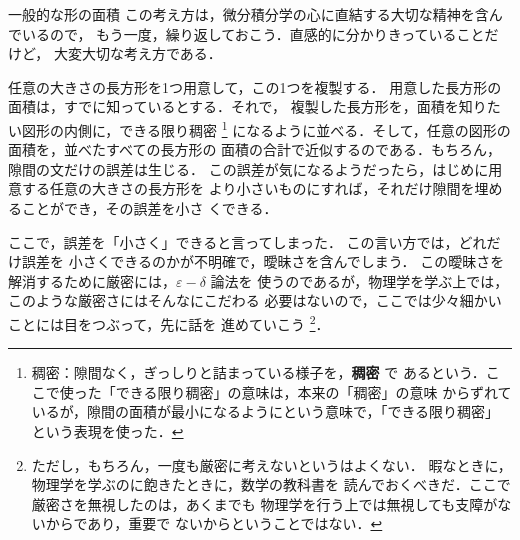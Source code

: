 \begin{memo}{一般的な形の面積}
                この考え方は，微分積分学の心に直結する大切な精神を含んでいるので，
                もう一度，繰り返しておこう．直感的に分かりきっていることだけど，
                大変大切な考え方である．

                任意の大きさの長方形を1つ用意して，この1つを複製する．
                用意した長方形の面積は，すでに知っているとする．それで，
                複製した長方形を，面積を知りたい図形の内側に，できる限り稠密
                    \footnote{
                        稠密：隙間なく，ぎっしりと詰まっている様子を，\textbf{稠密} で
                        あるという．ここで使った「できる限り稠密」の意味は，本来の「稠密」の意味
                        からずれているが，隙間の面積が最小になるようにという意味で，「できる限り稠密」
                        という表現を使った．
                    }
                になるように並べる．そして，任意の図形の面積を，並べたすべての長方形の
                面積の合計で近似するのである．もちろん，隙間の文だけの誤差は生じる．
                この誤差が気になるようだったら，はじめに用意する任意の大きさの長方形を
                より小さいものにすれば，それだけ隙間を埋めることができ，その誤差を小さ
                くできる．

                ここで，誤差を「小さく」できると言ってしまった．
                この言い方では，どれだけ誤差を
                小さくできるのかが不明確で，曖昧さを含んでしまう．
                この曖昧さを解消するために厳密には，$\varepsilon - \delta$ 論法を
                使うのであるが，物理学を学ぶ上では，このような厳密さにはそんなにこだわる
                必要はないので，ここでは少々細かいことには目をつぶって，先に話を
                進めていこう
                    \footnote{
                        ただし，もちろん，一度も厳密に考えないというはよくない．
                        暇なときに，物理学を学ぶのに飽きたときに，数学の教科書を
                        読んでおくべきだ．ここで厳密さを無視したのは，あくまでも
                        物理学を行う上では無視しても支障がないからであり，重要で
                        ないからということではない．
                    }．
            \end{memo}

